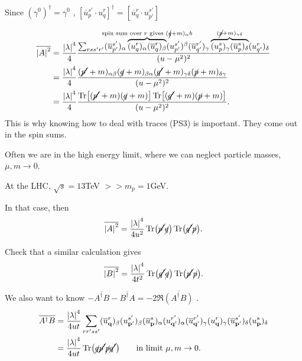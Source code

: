\begin{remark}
  Since $(\gamma^0)^{\dagger} = \gamma^0$ , $[\overline{u}^{s'}_{p} \cdot u^{r}_{q}]^{\dagger} = [\overline{u}^{r}_{q} \cdot u^{s'}_{p'}]$ 
\end{remark}
\begin{align}
  \overline{\abs{A}^2} &= \frac{\abs{\lambda}^4}{4} \frac{\sum_{rss'r'} (\overline{u}{}^{s'}_{p'})_{\alpha} \overbrace{(u^{r}_{q})_{\alpha} (\overline{u}{}^{r}_{q})_{\beta}}^{\mathclap{\text{spin sum over $r$ gives } (\cancel{q} + m)_{\alpha}b}} (u^{s'}_{p'})^{\beta} (\overline{u}{}^{r'}_{q'})_{\gamma} \overbrace{(u^{s}_{p})_{\gamma} (\overline{u}{}^{s}_{p})_{\delta}}^{\mathclap{(\cancel{p} + m)_{\gamma\delta}}} (u^{r}_{q'})_{\delta} }{(u - \mu^2)^2} \\
  &= \frac{\abs{\lambda}^4}{4} \frac{(\cancel{p'} + m)_{\alpha\beta} (\cancel{q} + m)_{\beta\alpha} (\cancel{q'} + m)_{\gamma\delta} (\cancel{p} + m)_{\delta\gamma}}{(u - \mu^2)^2}  \\
  &= \frac{\abs{\lambda}^4}{4} \frac{\Tr[(\cancel{p'} + m)(\cancel{q} + m)] \Tr[(\cancel{q'} + m )(\cancel{p} + m)]}{(u - \mu^2)^2}.
\end{align}
This is why knowing how to deal with traces (PS3) is important. They come out in the spin sums.

Often we are in the high energy limit, where we can neglect particle masses, $\mu, m \to 0$.
 \begin{example}[]
  At the LHC, $\sqrt{s} = 13$TeV $>> m_p = 1$GeV.
\end{example}
In that case, then 
\begin{equation}
  \overline{\abs{A}^2} = \frac{\abs{\lambda}^4}{4 u^2} \Tr(\cancel{p'} \cancel{q}) \Tr(\cancel{q'} \cancel{p}).
\end{equation}
\begin{exercise}
  Check that a similar calculation gives
  \begin{equation}
    \overline{\abs{B}^2} = \frac{\abs{\lambda}^4}{4t^2} \Tr(\cancel{q'} \cancel{q}) \Tr(\cancel{p'} \cancel{p}).
  \end{equation}
\end{exercise}
We also want to know $- \overline{A^{\dagger} B} - \overline{B^{\dagger} A} = -2 \Re \overline{(A^{\dagger} B)}$ .
\begin{align}
  \overline{A^{\dagger} B} &= \frac{\abs{\lambda}^4}{4 ut} \sum_{r r' s s'} (\overline{u}^{r}_{\vb{q}})_{\beta} (u^{s'}_{\vb{p'}})_{\beta} (\overline{u}{}^{s}_{\vb{p}})_{\alpha}(u^{r'}_{\vb{q}'})_{\alpha} (\overline{u}{}^{r'}_{\vb{q}'})_{\gamma} (u^{r}_{\vb{q}})_{\gamma} (\overline{u}{}^{s'}_{\vb{p}'})_{\delta} (u^{s}_{\vb{p}})_{\delta} \\
			   &= \frac{\abs{\lambda}^4}{4ut} \Tr (\cancel{q} \cancel{p'} \cancel{p} \cancel{q'}) \qquad \text{in limit } \mu, m \to 0.
\end{align}

